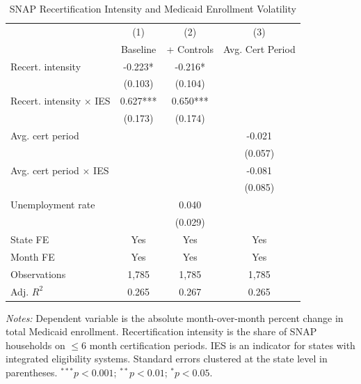 \begin{table}[t]
\centering
\caption{SNAP Recertification Intensity and Medicaid Enrollment Volatility}
\label{tab:main}
\begin{tabular}{lccc}
\hline\hline
 & (1) & (2) & (3) \\
 & Baseline & + Controls & Avg. Cert Period \\
\hline
Recert. intensity & -0.223* & -0.216* & \\
 & (0.103) & (0.104) & \\
Recert. intensity $\times$ IES & 0.627*** & 0.650*** & \\
 & (0.173) & (0.174) & \\
Avg. cert period & & & -0.021 \\
 & & & (0.057) \\
Avg. cert period $\times$ IES & & & -0.081 \\
 & & & (0.085) \\
Unemployment rate & & 0.040 & \\
 & & (0.029) & \\
\addlinespace
State FE & Yes & Yes & Yes \\
Month FE & Yes & Yes & Yes \\
Observations & 1,785 & 1,785 & 1,785 \\
Adj. $R^2$ & 0.265 & 0.267 & 0.265 \\
\hline\hline
\end{tabular}
\begin{tablenotes}
\item \textit{Notes:} Dependent variable is the absolute month-over-month percent change in total Medicaid enrollment. Recertification intensity is the share of SNAP households on $\leq$6 month certification periods. IES is an indicator for states with integrated eligibility systems. Standard errors clustered at the state level in parentheses. $^{***}p<0.001$; $^{**}p<0.01$; $^{*}p<0.05$.
\end{tablenotes}
\end{table}

